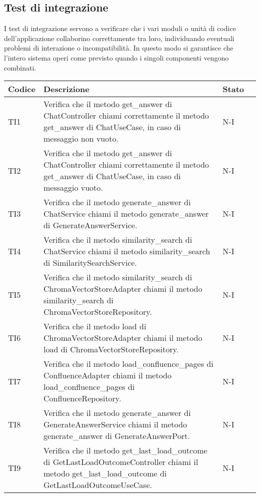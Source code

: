 \newpage

\subsection{Test di integrazione}
\label{sec:Test di integrazione}
I test di integrazione servono a verificare che i vari moduli o unità di codice dell’applicazione collaborino correttamente tra loro, individuando eventuali problemi di interazione o incompatibilità. In questo modo si garantisce che l’intero sistema operi come previsto quando i singoli componenti vengono combinati.\\
\begin{table}[h!]
    \centering
    \renewcommand{\arraystretch}{1.5}
    \begin{tabularx}{\textwidth}{|p{}|X|p{}|p{}|}\hline
    \rowcolor[HTML]{FFD700}
    \textbf{Codice} & \textbf{Descrizione}  & \textbf{Stato} \\ \hline
    TI1 & Verifica che il metodo get\_answer di ChatController chiami correttamente il metodo get\_answer di ChatUseCase, in caso di messaggio non vuoto. &  N-I \\ \hline
    TI2 & Verifica che il metodo get\_answer di ChatController chiami correttamente il metodo get\_answer di ChatUseCase, in caso di messaggio vuoto. &  N-I \\ \hline
    TI3 & Verifica che il metodo generate\_answer di ChatService chiami il metodo generate\_answer di GenerateAnswerService. &  N-I \\ \hline
    TI4 & Verifica che il metodo similarity\_search di ChatService chiami il metodo similarity\_search di SimilaritySearchService. &  N-I \\ \hline
    TI5 & Verifica che il metodo similarity\_search di ChromaVectorStoreAdapter chiami il metodo similarity\_search di ChromaVectorStoreRepository. &  N-I \\ \hline
    TI6 & Verifica che il metodo load di ChromaVectorStoreAdapter chiami il metodo load di ChromaVectorStoreRepository. &  N-I \\ \hline
    TI7 & Verifica che il metodo load\_confluence\_pages di ConfluenceAdapter chiami il metodo load\_confluence\_pages di ConfluenceRepository. &  N-I \\ \hline
    TI8 & Verifica che il metodo generate\_answer di GenerateAnswerService chiami il metodo generate\_answer di GenerateAnswerPort. &  N-I \\ \hline
    TI9 & Verifica che il metodo get\_last\_load\_outcome di GetLastLoadOutcomeController chiami il metodo get\_last\_load\_outcome di GetLastLoadOutcomeUseCase. &  N-I \\ \hline

\end{tabularx}
\end{table}
